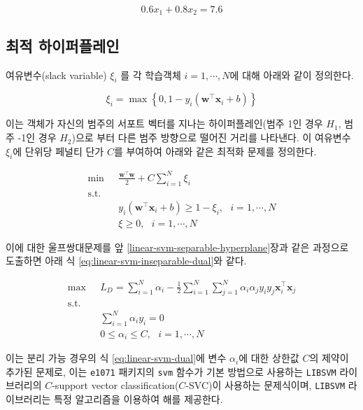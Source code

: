 \documentclass[]{book}
\begin{document}
\[
0.6 x_{1} + 0.8 x_{2} = 7.6
\]

\hypertarget{linear-svm-inseparable-hyperplane}{%
\subsection{최적 하이퍼플레인}\label{linear-svm-inseparable-hyperplane}}

여유변수(slack variable) \(\xi_i\) 를 각 학습객체 \(i = 1, \cdots, N\)에 대해 아래와 같이 정의한다.

\begin{equation*}
\xi_i = \max \left\{ 0, 1 - y_i (\mathbf{w}^\top \mathbf{x}_i + b) \right\}
\end{equation*}

이는 객체가 자신의 범주의 서포트 벡터를 지나는 하이퍼플레인(범주 1인 경우 \(H_1\), 범주 -1인 경우 \(H_2\))으로 부터 다른 범주 방향으로 떨어진 거리를 나타낸다. 이 여유변수 \(\xi_i\)에 단위당 페널티 단가 \(C\)를 부여하여 아래와 같은 최적화 문제를 정의한다.

\begin{equation*}
\begin{split}
\min \text{  } & \frac{\mathbf{w}^\top \mathbf{w}}{2} + C \sum_{i = 1}^{N} \xi_i \\
\text{s.t.}& \\
& y_i \left( \mathbf{w}^\top \mathbf{x}_i + b \right) \ge 1 - \xi_i, \text{  } i = 1, \cdots, N \\
& \xi \ge 0, \text{  } i = 1, \cdots, N
\end{split}
\end{equation*}

이에 대한 울프쌍대문제를 앞 \ref{linear-svm-separable-hyperplane}장과 같은 과정으로 도출하면 아래 식 \eqref{eq:linear-svm-inseparable-dual}와 같다.

\begin{equation}
\begin{split}
\max \text{  } & L_D = \sum_{i = 1}^{N} \alpha_i - \frac{1}{2} \sum_{i = 1}^{N} \sum_{j = 1}^{N} \alpha_i \alpha_j y_i y_j \mathbf{x}_i^\top \mathbf{x}_j\\
\text{s.t. } &\\
& \sum_{i = 1}^{N} \alpha_i y_i = 0\\
& 0 \le \alpha_i \le C, \text{  } i = 1, \cdots, N
\end{split}
\label{eq:linear-svm-inseparable-dual}
\end{equation}

이는 분리 가능 경우의 식 \eqref{eq:linear-svm-dual}에 변수 \(\alpha_i\)에 대한 상한값 \(C\)의 제약이 추가된 문제로, 이는 \texttt{e1071} 패키지의 \texttt{svm} 함수가 기본 방법으로 사용하는 \texttt{LIBSVM} 라이브러리\citep{chang2011libsvm}의 \(C\)-support vector classification(\(C\)-SVC)이 사용하는 문제식이며, \texttt{LIBSVM} 라이브러리는 특정 알고리즘\citep{fan2005working}을 이용하여 해를 제공한다.
\end{document}
